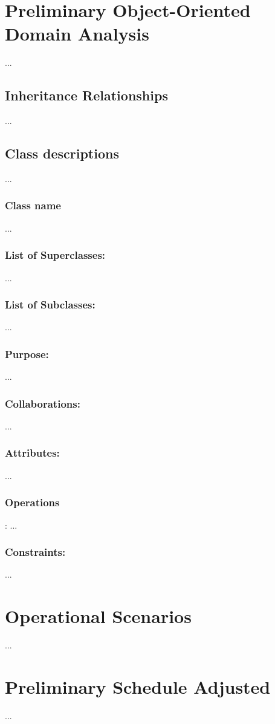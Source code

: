 \documentclass[]{article}
\begin{document}
\section{Preliminary Object-Oriented Domain Analysis}
...
\subsection{Inheritance Relationships}
...
\subsection{Class descriptions}
...
\subsubsection{ Class name}
... 
\subsubsection {List of Superclasses:} 
... 
\subsubsection {List of Subclasses:} 
... 
\subsubsection {Purpose: }
... 
\subsubsection {Collaborations: }
... 
\subsubsection {Attributes: }
... 
\subsubsection {Operations}: 
... 
\subsubsection {Constraints:} 
... 

\section{Operational Scenarios}
... 

\section{Preliminary Schedule Adjusted}
... 
\end{document}
